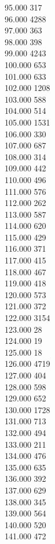 { 95.000	317 \\
 96.000	4288 \\
 97.000	363 \\
 98.000	398 \\
 99.000	4243 \\
 100.000	653 \\
 101.000	633 \\
 102.000	1208 \\
 103.000	588 \\
 104.000	514 \\
 105.000	1531 \\
 106.000	330 \\
 107.000	687 \\
 108.000	314 \\
 109.000	442 \\
 110.000	496 \\
 111.000	576 \\
 112.000	262 \\
 113.000	587 \\
 114.000	620 \\
 115.000	429 \\
 116.000	371 \\
 117.000	415 \\
 118.000	467 \\
 119.000	418 \\
 120.000	573 \\
 121.000	372 \\
 122.000	3154 \\
 123.000	28 \\
 124.000	19 \\
 125.000	18 \\
 126.000	4719 \\
 127.000	404 \\
 128.000	598 \\
 129.000	652 \\
 130.000	1728 \\
 131.000	713 \\
 132.000	494 \\
 133.000	211 \\
 134.000	476 \\
 135.000	635 \\
 136.000	392 \\
 137.000	629 \\
 138.000	345 \\
 139.000	564 \\
 140.000	520 \\
 141.000	472 \\
}

